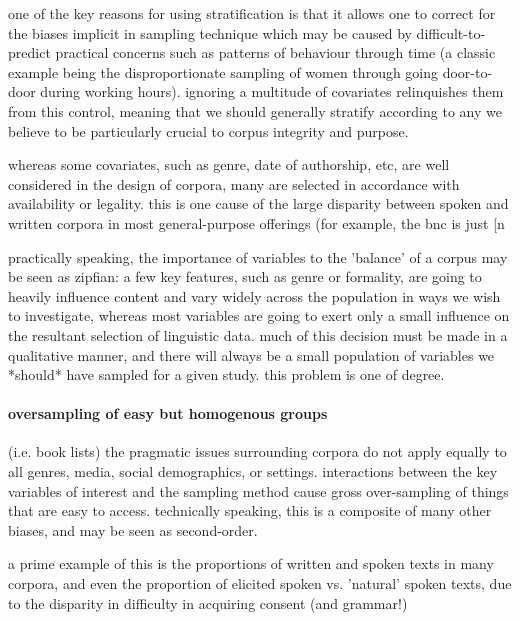 one of the key reasons for using stratification is that it allows one to correct for the biases implicit in sampling technique which may be caused by difficult-to-predict practical concerns such as patterns of behaviour through time (a classic example being the disproportionate sampling of women through going door-to-door during working hours).  ignoring a multitude of covariates relinquishes them from this control, meaning that we should generally stratify according to any we believe to be particularly crucial to corpus integrity and purpose.

whereas some covariates, such as genre, date of authorship, etc, are well considered in the design of corpora, many are selected in accordance with availability or legality.  this is one cause of the large disparity between spoken and written corpora in most general-purpose offerings (for example, the bnc is just [n%

practically speaking, the importance of variables to the 'balance' of a corpus may be seen as zipfian: a few key features, such as genre or formality, are going to heavily influence content and vary widely across the population in ways we wish to investigate, whereas most variables are going to exert only a small influence on the resultant selection of linguistic data.  much of this decision must be made in a qualitative manner, and there will always be a small population of variables we *should* have sampled for a given study.  this problem is one of degree.



\paragraph{ oversampling of easy but homogenous groups }
(i.e. book lists)
the pragmatic issues surrounding corpora do not apply equally to all genres, media, social demographics, or settings.  interactions between the key variables of interest and the sampling method cause gross over-sampling of things that are easy to access.  technically speaking, this is a composite of many other biases, and may be seen as second-order.

a prime example of this is the proportions of written and spoken texts in many corpora, and even the proportion of elicited spoken vs. 'natural' spoken texts, due to the disparity in difficulty in acquiring consent (and grammar!)


